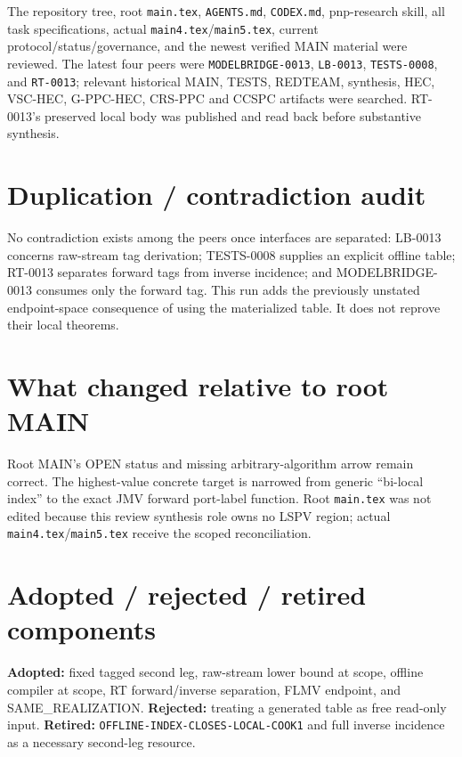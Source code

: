 \documentclass[11pt]{article}
\begin{document}
The repository tree, root \texttt{main.tex}, \texttt{AGENTS.md},
\texttt{CODEX.md}, pnp-research skill, all task specifications, actual
\texttt{main4.tex}/\texttt{main5.tex}, current protocol/status/governance,
and the newest verified MAIN material were reviewed.  The latest four peers
were \texttt{MODELBRIDGE-0013}, \texttt{LB-0013}, \texttt{TESTS-0008}, and
\texttt{RT-0013}; relevant historical MAIN, TESTS, REDTEAM, synthesis, HEC,
VSC-HEC, G-PPC-HEC, CRS-PPC and CCSPC artifacts were searched.  RT-0013's
preserved local body was published and read back before substantive
synthesis.

\section{Duplication / contradiction audit}

No contradiction exists among the peers once interfaces are separated:
LB-0013 concerns raw-stream tag derivation; TESTS-0008 supplies an explicit
offline table; RT-0013 separates forward tags from inverse incidence; and
MODELBRIDGE-0013 consumes only the forward tag.  This run adds the previously
unstated endpoint-space consequence of using the materialized table.  It does
not reprove their local theorems.

\section{What changed relative to root MAIN}

Root MAIN's OPEN status and missing arbitrary-algorithm arrow remain correct.
The highest-value concrete target is narrowed from generic ``bi-local index''
to the exact JMV forward port-label function.  Root \texttt{main.tex} was not
edited because this review synthesis role owns no LSPV region; actual
\texttt{main4.tex}/\texttt{main5.tex} receive the scoped reconciliation.

\section{Adopted / rejected / retired components}

\textbf{Adopted:} fixed tagged second leg, raw-stream lower bound at scope,
offline compiler at scope, RT forward/inverse separation, FLMV endpoint, and
SAME\_REALIZATION.  \textbf{Rejected:} treating a generated table as free
read-only input.  \textbf{Retired:} 
\texttt{OFFLINE-INDEX-CLOSES-LOCAL-COOK1} and full inverse incidence as a
necessary second-leg resource.
\end{document}
